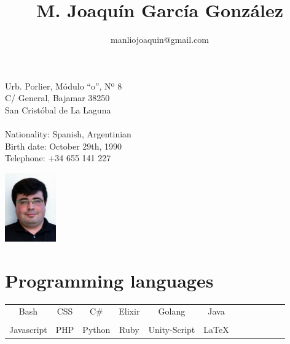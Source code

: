 \documentclass[10pt]{article}
\title{\bfseries M. Joaquín García González}
\author{manliojoaquin@gmail.com}
\date{}
\begin{document}

    \maketitle

    \vspace{4em}

    \begin{minipage}[ht]{0.48\textwidth}
        Urb. Porlier, Módulo ``o'', Nº 8\\
        C/ General, Bajamar 38250\\
        San Cristóbal de La Laguna\\
        \\
        Nationality: Spanish, Argentinian\\
        Birth date: October 29th, 1990\\
        Telephone: +34 655 141 227
    \end{minipage}
    \begin{minipage}[ht]{0.48\textwidth}
        \begin{flushright}
        \includegraphics[height=8em]{profile}
        \end{flushright}
    \end{minipage}

    \vspace{4em}

    \section*{Programming languages}
    \begin{center}
    \begin{tabular}{ c c c c c c c c c c c c }

        Bash & CSS & C\# & Elixir & Golang & Java \\\\

        Javascript & PHP & Python & Ruby & Unity-Script & \LaTeX

    \end{tabular}
    \end{center}
\end{document}
